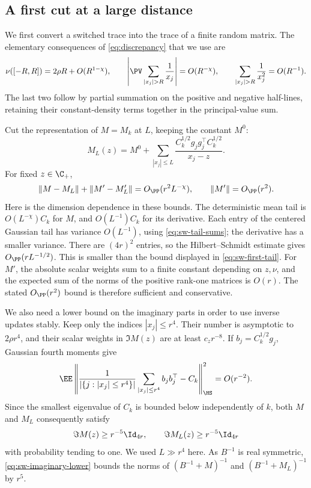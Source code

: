 \subsection{A first cut at a large distance}

We first convert a switched trace into the trace of a finite random matrix.
The elementary consequences of \eqref{eq:discrepancy} that we use are
\begin{equation}\label{eq:sw-tail-sums}
 \nu([-R,R])=2\rho R+O(R^{1-\chi}),\qquad
 \left|\PV\sum_{|x_j|>R}\frac1{x_j}\right|=O(R^{-\chi}),
 \qquad
 \sum_{|x_j|>R}\frac1{x_j^2}=O(R^{-1}).
\end{equation}
The last two follow by partial summation on the positive and negative
half-lines, retaining their constant-density terms together in the
principal-value sum.

Cut the representation of \(M=M_k\) at \(L\), keeping the constant \(M^0\):
\[
 M_L(z)=M^0+
 \sum_{|x_j|\le L}
 \frac{C_k^{1/2}g_jg_j^\top C_k^{1/2}}{x_j-z}.
\]
For fixed \(z\in\C_+\),
\begin{equation}\label{eq:sw-first-tail}
 \|M-M_L\|+\|M'-M_L'\|=O_{\PP}(r^2L^{-\chi}),
 \qquad \|M'\|=O_{\PP}(r^2).
\end{equation}
Here is the dimension dependence in these bounds. The deterministic mean
tail is \(O(L^{-\chi})C_k\) for \(M\), and \(O(L^{-1})C_k\) for its
derivative. Each entry of the centered Gaussian tail has variance
\(O(L^{-1})\), using \eqref{eq:sw-tail-sums}; the derivative has a smaller
variance. There are \((4r)^2\) entries, so the Hilbert--Schmidt estimate gives
\(O_{\PP}(rL^{-1/2})\). This is smaller than the bound displayed in
\eqref{eq:sw-first-tail}. For \(M'\), the absolute scalar weights sum to a
finite constant depending on \(z,\nu\), and the expected sum of the norms of
the positive rank-one matrices is \(O(r)\). The stated \(O_{\PP}(r^2)\) bound is
therefore sufficient and conservative.

We also need a lower bound on the imaginary parts in order to use inverse
updates stably. Keep only the indices \(|x_j|\le r^4\). Their number is
asymptotic to \(2\rho r^4\), and their scalar weights in \(\Im M(z)\) are at
least \(c_z r^{-8}\). If \(b_j=C_k^{1/2}g_j\), Gaussian fourth moments give
\[
 \EE\left\|
 \frac1{|\{j:|x_j|\le r^4\}|}
 \sum_{|x_j|\le r^4}b_jb_j^\top-C_k
 \right\|_{\HS}^2=O(r^{-2}).
\]
Since the smallest eigenvalue of \(C_k\) is bounded below independently of
\(k\), both \(M\) and \(M_L\) consequently satisfy
\begin{equation}\label{eq:sw-imaginary-lower}
 \Im M(z)\ge r^{-5}\Id_{4r},\qquad
 \Im M_L(z)\ge r^{-5}\Id_{4r}
\end{equation}
with probability tending to one. We used \(L\gg r^4\) here.
As \(B^{-1}\) is real symmetric, \eqref{eq:sw-imaginary-lower} bounds the
norms of \((B^{-1}+M)^{-1}\) and \((B^{-1}+M_L)^{-1}\) by \(r^5\).

